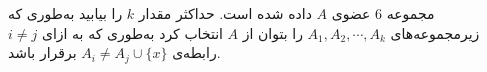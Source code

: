 \EXERCISE
مجموعه
$6$
عضوی
$A$
داده شده است. حداکثر مقدار
$k$
را بیابید به‌طوری که زیرمجموعه‌های
$A_1, A_2, \cdots, A_k$
را بتوان از
$A$
انتخاب کرد به‌طوری که به ازای
$i \neq j$
رابطه‌ی
$A_i \neq A_j \cup \{x\}$
برقرار باشد.